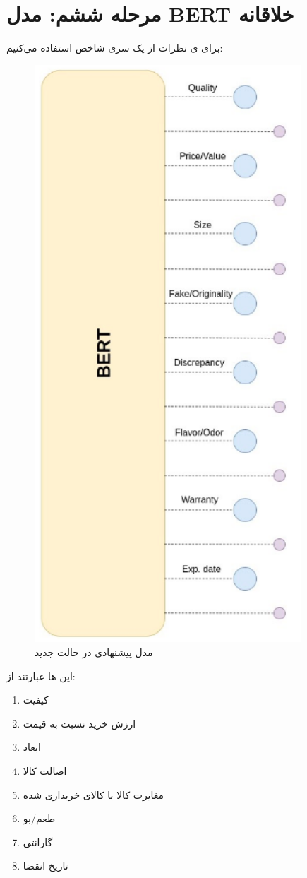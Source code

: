 \section{مرحله ششم: مدل BERT خلاقانه}

برای 
ی نظرات از یک سری شاخص استفاده می‌کنیم:

\begin{figure}[H]
\centering
\includegraphics[width=10cm]{figs/bert_model.png}
\caption{مدل پیشنهادی در حالت جدید}\label{}
\label{fig:test}
\end{figure}

این ها عبارتند از:
\begin{enumerate}
    \item کیفیت
    \item ارزش خرید نسبت به قیمت
    \item ابعاد
    \item اصالت کالا
    \item مغایرت کالا با کالای خریداری شده
    \item طعم/بو
    \item گارانتی
    \item تاریخ انقضا
\end{enumerate}


